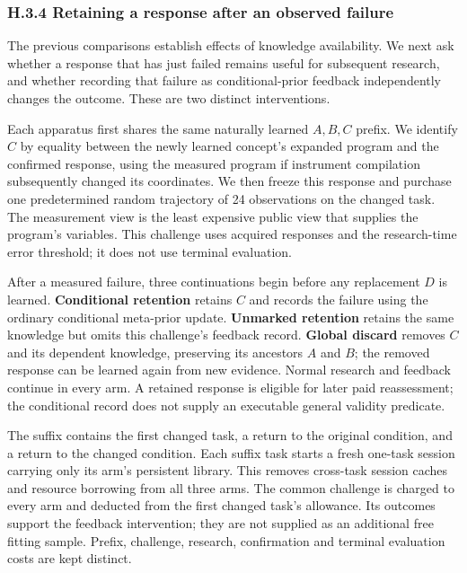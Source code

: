 \documentclass[twoside,11pt]{article}
\begin{document}
\subsubsection*{H.3.4 Retaining a response after an observed failure}

The previous comparisons establish effects of knowledge availability. We next ask whether a response that has just failed remains useful for subsequent research, and whether recording that failure as conditional-prior feedback independently changes the outcome. These are two distinct interventions.


Each apparatus first shares the same naturally learned \(A,B,C\) prefix. We identify \(C\) by equality between the newly learned concept's expanded program and the confirmed response, using the measured program if instrument compilation subsequently changed its coordinates. We then freeze this response and purchase one predetermined random trajectory of 24 observations on the changed task. The measurement view is the least expensive public view that supplies the program's variables. This challenge uses acquired responses and the research-time error threshold; it does not use terminal evaluation.


After a measured failure, three continuations begin before any replacement \(D\) is learned. \textbf{Conditional retention} retains \(C\) and records the failure using the ordinary conditional meta-prior update. \textbf{Unmarked retention} retains the same knowledge but omits this challenge's feedback record. \textbf{Global discard} removes \(C\) and its dependent knowledge, preserving its ancestors \(A\) and \(B\); the removed response can be learned again from new evidence. Normal research and feedback continue in every arm. A retained response is eligible for later paid reassessment; the conditional record does not supply an executable general validity predicate.


The suffix contains the first changed task, a return to the original condition, and a return to the changed condition. Each suffix task starts a fresh one-task session carrying only its arm's persistent library. This removes cross-task session caches and resource borrowing from all three arms. The common challenge is charged to every arm and deducted from the first changed task's allowance. Its outcomes support the feedback intervention; they are not supplied as an additional free fitting sample. Prefix, challenge, research, confirmation and terminal evaluation costs are kept distinct.
\end{document}
